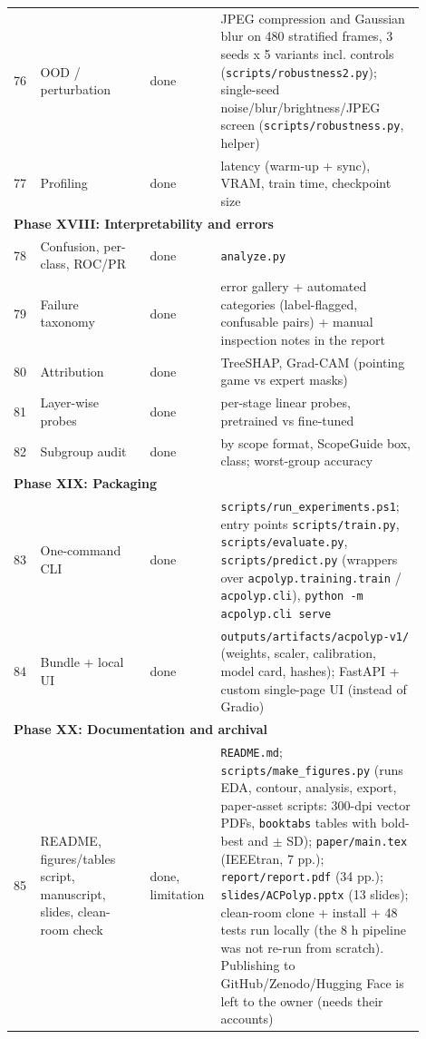 \begin{longtable}{p{0.05\linewidth}p{0.25\linewidth}p{0.14\linewidth}p{0.46\linewidth}}
76 & OOD / perturbation & done & JPEG compression and Gaussian blur on 480 stratified frames, 3 seeds x 5 variants incl. controls (\texttt{scripts/robustness2.py}); single-seed noise/blur/brightness/JPEG screen (\texttt{scripts/robustness.py}, helper) \\
77 & Profiling & done & latency (warm-up + sync), VRAM, train time, checkpoint size \\
\midrule\multicolumn{4}{l}{\textbf{Phase XVIII: Interpretability and errors}}\\\midrule
78 & Confusion, per-class, ROC/PR & done & \texttt{analyze.py} \\
79 & Failure taxonomy & done & error gallery + automated categories (label-flagged, confusable pairs) + manual inspection notes in the report \\
80 & Attribution & done & TreeSHAP, Grad-CAM (pointing game vs expert masks) \\
81 & Layer-wise probes & done & per-stage linear probes, pretrained vs fine-tuned \\
82 & Subgroup audit & done & by scope format, ScopeGuide box, class; worst-group accuracy \\
\midrule\multicolumn{4}{l}{\textbf{Phase XIX: Packaging}}\\\midrule
83 & One-command CLI & done & \texttt{scripts/run\_experiments.ps1}; entry points \texttt{scripts/train.py}, \texttt{scripts/evaluate.py}, \texttt{scripts/predict.py} (wrappers over \texttt{acpolyp.training.train} / \texttt{acpolyp.cli}), \texttt{python -m acpolyp.cli serve} \\
84 & Bundle + local UI & done & \texttt{outputs/artifacts/acpolyp-v1/} (weights, scaler, calibration, model card, hashes); FastAPI + custom single-page UI (instead of Gradio) \\
\midrule\multicolumn{4}{l}{\textbf{Phase XX: Documentation and archival}}\\\midrule
85 & README, figures/tables script, manuscript, slides, clean-room check & done, limitation & \texttt{README.md}; \texttt{scripts/make\_figures.py} (runs EDA, contour, analysis, export, paper-asset scripts: 300-dpi vector PDFs, \texttt{booktabs} tables with bold-best and \ensuremath{\pm} SD); \texttt{paper/main.tex} (IEEEtran, 7 pp.); \texttt{report/report.pdf} (34 pp.); \texttt{slides/ACPolyp.pptx} (13 slides); clean-room clone + install + 48 tests run locally (the 8 h pipeline was not re-run from scratch). Publishing to GitHub/Zenodo/Hugging Face is left to the owner (needs their accounts) \\
\bottomrule\end{longtable}
